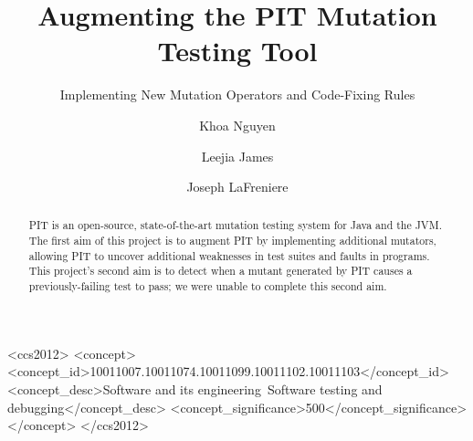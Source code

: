 \documentclass[sigconf]{acmart}
\begin{document}
\title{Augmenting the PIT Mutation Testing Tool}
\subtitle{Implementing New Mutation Operators and Code-Fixing Rules}


\author{Khoa Nguyen}

\author{Leejia James}

\author{Joseph LaFreniere}

\begin{abstract}
  PIT is an open-source, state-of-the-art mutation testing system for Java and the JVM.
  The first aim of this project is to augment PIT by implementing additional mutators, allowing PIT to uncover additional weaknesses in test suites and faults in programs.
  This project's second aim is to detect when a mutant generated by PIT causes a previously-failing test to pass;
  we were unable to complete this second aim.
\end{abstract}

%
%
\begin{CCSXML}
  <ccs2012>
  <concept>
  <concept_id>10011007.10011074.10011099.10011102.10011103</concept_id>
  <concept_desc>Software and its engineering~Software testing and debugging</concept_desc>
  <concept_significance>500</concept_significance>
  </concept>
  </ccs2012>
\end{CCSXML}




\maketitle







\end{document}
